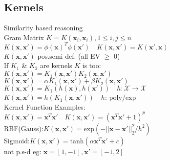\subsection*{Kernels}
Similarity based reasoning\\
Gram Matrix $K{=}K(\mathbf{x}_i, \mathbf{x}_i), 1{\leq} i,j{\leq} n$\\
$K(\mathbf{x}, \mathbf{x'}) {=} \phi(\mathbf{x})^T\phi(\mathbf{x'})\quad K(\mathbf{x},\mathbf{x'}){=}K(\mathbf{x'},\mathbf{x})$\\
$K(\mathbf{x},\mathbf{x'})$ pos.semi-def. (all EV $\geq$ 0)\\
If $K_1$ \& $K_2$ are kernels $K$ is too:\\
$K(\mathbf{x}, \mathbf{x'})=K_1(\mathbf{x}, \mathbf{x'})K_2(\mathbf{x}, \mathbf{x'})$\\
$K(\mathbf{x},\mathbf{x'})=\alpha K_1(\mathbf{x}, \mathbf{x'})+\beta K_2(\mathbf{x}, \mathbf{x'})$\\
$K(\mathbf{x},\mathbf{x'}){=}K_1(h(\mathbf{x}), h(\mathbf{x'}))\quad h:\mathcal{X}{\rightarrow}\mathcal{X}$\\
$K(\mathbf{x},\mathbf{x'}){=}h(K_1(\mathbf{x}, \mathbf{x'}))\quad h$: poly/exp\\
Kernel Function Examples:\\
$K(\mathbf{x},\mathbf{x'}){=}\mathbf{x}^T\mathbf{x'}\quad K(\mathbf{x},\mathbf{x'}){=}(\mathbf{x}^T\mathbf{x'}{+}1)^p$\\
RBF(Gauss):$K(\mathbf{x},\mathbf{x'}){=}\mathrm{exp}(-||\mathbf{x}{-}\mathbf{x'}||_2^2/h^2)$\\
Sigmoid:$K(\mathbf{x},\mathbf{x'}){=}\mathrm{tanh}(\alpha\mathbf{x}^T\mathbf{x'}+c)$\\
not p.s-d eg: $\mathbf{x}{=}[1,-1], \mathbf{x'}{=}[-1,2]$